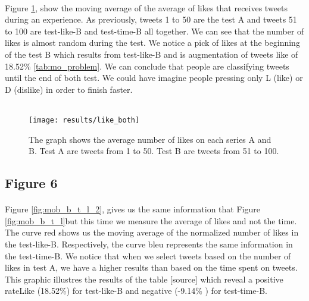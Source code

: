 \paragraph{}
Figure \ref{fig:like_both}, show the moving average of the average of likes that receives tweets during an experience. As previously, tweets 1 to 50 are the test A and tweets 51 to 100 are test-like-B and test-time-B all together. We can see that the number of likes is almost random during the test. We notice a pick of likes at the beginning of the test B which results from test-like-B and is augmentation of tweets like of 18.52\% \ref{tab:mo_problem}. We can conclude that people are classifying tweets until the end of both test. We could have imagine people pressing only L (like) or D (dislike) in order to finish faster. \\ \\

\begin{figure}[h] 
\centering 
\texttt{[image: results/like\_both]} 
\caption[Average like on the 100 tweets]{The graph shows the average number of likes on each series A and B. Test A are tweets from 1 to 50. Test B are tweets from 51 to 100.}
\label{fig:like_both} 
\end{figure}

\subsection{Figure 6}

\paragraph{}
Figure \ref{fig:mob_b_t_l_2}, gives us the same information that Figure \ref{fig:mob_b_t_l}but this time we measure the average of likes and not the time. The curve red shows us the moving average of the normalized number of likes in the test-like-B. Respectively, the curve bleu represents the same information in the test-time-B. We notice that when we select tweets based on the number of likes in test A, we have a higher results than based on the time spent on tweets. This graphic illustres the results of the table [source] which reveal a positive rateLike (18.52\%) for test-like-B and negative (-9.14\% ) for test-time-B. \\\\\\\\\\\\\\\\

